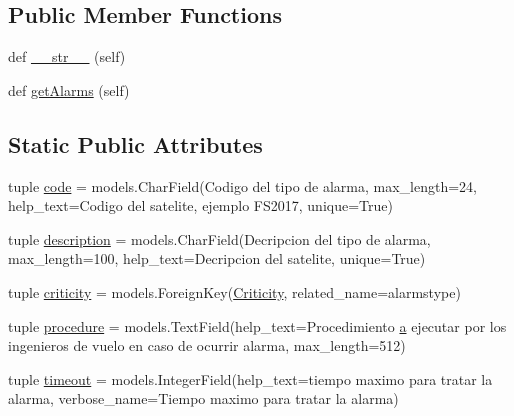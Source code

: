 \subsection*{Public Member Functions}
\begin{DoxyCompactItemize}
\item 
def \hyperlink{class_ground_segment_1_1models_1_1_alarm_1_1_alarm_type_1_1_alarm_type_a4a6e1931fffb3b2e3b7d626c0d14ca3d}{\+\_\+\+\_\+str\+\_\+\+\_\+} (self)
\item 
def \hyperlink{class_ground_segment_1_1models_1_1_alarm_1_1_alarm_type_1_1_alarm_type_ad44ce90a839d55cc1bf5a43286d2f563}{get\+Alarms} (self)
\end{DoxyCompactItemize}
\subsection*{Static Public Attributes}
\begin{DoxyCompactItemize}
\item 
tuple \hyperlink{class_ground_segment_1_1models_1_1_alarm_1_1_alarm_type_1_1_alarm_type_ac9eaaf8b7552228f2a84b1851b0ec680}{code} = models.\+Char\+Field(\textquotesingle{}Codigo del tipo de alarma\textquotesingle{}, max\+\_\+length=24, help\+\_\+text=\textquotesingle{}Codigo del satelite, ejemplo F\+S2017\textquotesingle{}, unique=True)
\item 
tuple \hyperlink{class_ground_segment_1_1models_1_1_alarm_1_1_alarm_type_1_1_alarm_type_a36cb958f8c0cb246dc2755299594b305}{description} = models.\+Char\+Field(\textquotesingle{}Decripcion del tipo de alarma\textquotesingle{}, max\+\_\+length=100, help\+\_\+text=\textquotesingle{}Decripcion del satelite\textquotesingle{}, unique=True)
\item 
tuple \hyperlink{class_ground_segment_1_1models_1_1_alarm_1_1_alarm_type_1_1_alarm_type_a2a764ea6656f351e7bca6d8c0e5ed767}{criticity} = models.\+Foreign\+Key(\hyperlink{class_ground_segment_1_1models_1_1_alarm_1_1_criticity_1_1_criticity}{Criticity}, related\+\_\+name=\textquotesingle{}alarmstype\textquotesingle{})
\item 
tuple \hyperlink{class_ground_segment_1_1models_1_1_alarm_1_1_alarm_type_1_1_alarm_type_a2ee12462c076bf934143f025e89694b0}{procedure} = models.\+Text\+Field(help\+\_\+text=\textquotesingle{}Procedimiento \hyperlink{bootstrap_8min_8js_a9252b696bd8018d152e6640fcbe6e3b8}{a} ejecutar por los ingenieros de vuelo en caso de ocurrir alarma\textquotesingle{}, max\+\_\+length=512)
\item 
tuple \hyperlink{class_ground_segment_1_1models_1_1_alarm_1_1_alarm_type_1_1_alarm_type_a331f064523fd857e0f7ad512d9c509d7}{timeout} = models.\+Integer\+Field(help\+\_\+text=\textquotesingle{}tiempo maximo para tratar la alarma\textquotesingle{}, verbose\+\_\+name=\textquotesingle{}Tiempo maximo para tratar la alarma\textquotesingle{})
\end{DoxyCompactItemize}


